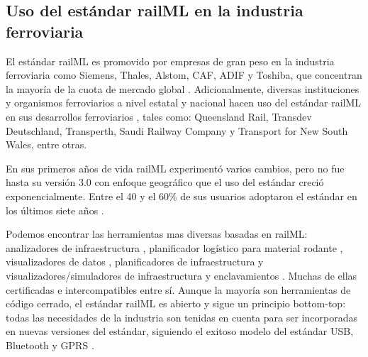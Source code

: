 \subsection{Uso del estándar railML en la industria ferroviaria}

    El estándar railML es promovido por empresas de gran peso en la industria ferroviaria como Siemens, Thales, Alstom, CAF, ADIF y Toshiba, que concentran la mayoría de la cuota de mercado global \cite{PARTNERS}. Adicionalmente, diversas instituciones y organismos ferroviarios a nivel estatal y nacional hacen uso del estándar railML en sus desarrollos ferroviarios \cite{PARTNERS}, tales como: Queensland Rail, Transdev Deutschland, Transperth, Saudi Railway Company y Transport for New South Wales, entre otras.

    En sus primeros años de vida railML experimentó varios cambios, pero no fue hasta su versión 3.0 con enfoque geográfico que el uso del estándar creció exponencialmente. Entre el 40 y el 60\% de sus usuarios adoptaron el estándar en los últimos siete años \cite{PARTNERS}.

    Podemos encontrar las herramientas mas diversas basadas en railML: analizadores de infraestructura \cite{MAPREX}, planificador logístico para material rodante \cite{IVU}, visualizadores de datos \cite{RAILVIVID}, planificadores de infraestructura \cite{VISALL3D} y visualizadores/simuladores de infraestructura y enclavamientos \cite{DESIGN4RAIL}. Muchas de ellas certificadas e intercompatibles entre sí. Aunque la mayoría son herramientas de código cerrado, el estándar railML es abierto y sigue un principio bottom-top: todas las necesidades de la industria son tenidas en cuenta para ser incorporadas en nuevas versiones del estándar, siguiendo el exitoso modelo del estándar USB, Bluetooth y GPRS \cite{USB,BLUETOOTH,GPRS}. 